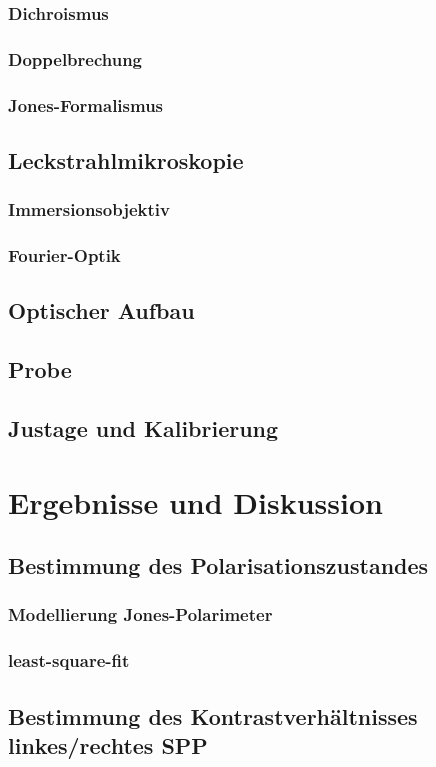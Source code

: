 \documentclass{article}
\begin{document}
	\subsubsection{Dichroismus}
	\subsubsection{Doppelbrechung}
	\subsubsection{Jones-Formalismus}
\subsection{Leckstrahlmikroskopie}
	\subsubsection{Immersionsobjektiv}
	\subsubsection{Fourier-Optik}
\subsection{Optischer Aufbau}
\subsection{Probe}
\subsection{Justage und Kalibrierung}
\section{Ergebnisse und Diskussion}
	\subsection{Bestimmung des Polarisationszustandes}
		\subsubsection{Modellierung Jones-Polarimeter}
		\subsubsection{least-square-fit}
	\subsection{Bestimmung des Kontrastverhältnisses linkes/rechtes SPP}
\end{document}
